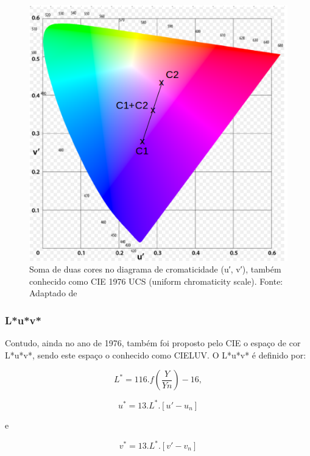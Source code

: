 \begin{figure}[!htb]
     \centering
     \includegraphics[scale=0.7]{img/luv_linearity.png}
     \caption{Soma de duas cores no diagrama de cromaticidade (u′, v′), também
conhecido como CIE 1976 UCS (uniform chromaticity scale). Fonte: Adaptado de
}
     \label{fig:cie_1976_luv}
\end{figure}

\subsubsection{L*u*v*}
\par
Contudo, ainda no ano de 1976, também foi proposto pelo CIE o espaço de cor
L*u*v*, sendo este espaço o conhecido como CIELUV. O L*u*v* é definido por:

\begin{equation}\label{eq:L*u*v*_L*}
L^*=116.f(\frac{Y}{Yn})-16,
\end{equation}

\begin{equation}\label{eq:L*u*v*_u*}
u^*=13.L^*.[u'-u_n]
\end{equation}

e

\begin{equation}\label{eq:L*u*v*_v*}
v^*=13.L^*.[v'-v_n]
\end{equation}

